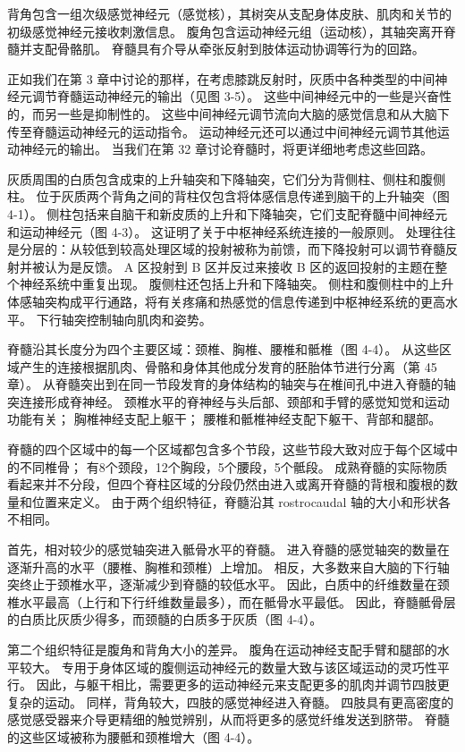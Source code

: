 背角包含一组次级感觉神经元（感觉核），其树突从支配身体皮肤、肌肉和关节的初级感觉神经元接收刺激信息。 腹角包含运动神经元组（运动核），其轴突离开脊髓并支配骨骼肌。 脊髓具有介导从牵张反射到肢体运动协调等行为的回路。

正如我们在第 3 章中讨论的那样，在考虑膝跳反射时，灰质中各种类型的中间神经元调节脊髓运动神经元的输出（见图 3-5）。 这些中间神经元中的一些是兴奋性的，而另一些是抑制性的。 这些中间神经元调节流向大脑的感觉信息和从大脑下传至脊髓运动神经元的运动指令。 运动神经元还可以通过中间神经元调节其他运动神经元的输出。 当我们在第 32 章讨论脊髓时，将更详细地考虑这些回路。

灰质周围的白质包含成束的上升轴突和下降轴突，它们分为背侧柱、侧柱和腹侧柱。 位于灰质两个背角之间的背柱仅包含将体感信息传递到脑干的上升轴突（图 4-1）。 侧柱包括来自脑干和新皮质的上升和下降轴突，它们支配脊髓中间神经元和运动神经元（图 4-3）。 这证明了关于中枢神经系统连接的一般原则。 处理往往是分层的：从较低到较高处理区域的投射被称为前馈，而下降投射可以调节脊髓反射并被认为是反馈。 A 区投射到 B 区并反过来接收 B 区的返回投射的主题在整个神经系统中重复出现。 腹侧柱还包括上升和下降轴突。 侧柱和腹侧柱中的上升体感轴突构成平行通路，将有关疼痛和热感觉的信息传递到中枢神经系统的更高水平。 下行轴突控制轴向肌肉和姿势。

脊髓沿其长度分为四个主要区域：颈椎、胸椎、腰椎和骶椎（图 4-4）。 从这些区域产生的连接根据肌肉、骨骼和身体其他成分发育的胚胎体节进行分离（第 45 章）。 从脊髓突出到在同一节段发育的身体结构的轴突与在椎间孔中进入脊髓的轴突连接形成脊神经。 颈椎水平的脊神经与头后部、颈部和手臂的感觉知觉和运动功能有关； 胸椎神经支配上躯干； 腰椎和骶椎神经支配下躯干、背部和腿部。

脊髓的四个区域中的每一个区域都包含多个节段，这些节段大致对应于每个区域中的不同椎骨； 有8个颈段，12个胸段，5个腰段，5个骶段。 成熟脊髓的实际物质看起来并不分段，但四个脊柱区域的分段仍然由进入或离开脊髓的背根和腹根的数量和位置来定义。 由于两个组织特征，脊髓沿其 rostrocaudal 轴的大小和形状各不相同。

首先，相对较少的感觉轴突进入骶骨水平的脊髓。 进入脊髓的感觉轴突的数量在逐渐升高的水平（腰椎、胸椎和颈椎）上增加。 相反，大多数来自大脑的下行轴突终止于颈椎水平，逐渐减少到脊髓的较低水平。 因此，白质中的纤维数量在颈椎水平最高（上行和下行纤维数量最多），而在骶骨水平最低。 因此，脊髓骶骨层的白质比灰质少得多，而颈髓的白质多于灰质（图 4-4）。

第二个组织特征是腹角和背角大小的差异。 腹角在运动神经支配手臂和腿部的水平较大。 专用于身体区域的腹侧运动神经元的数量大致与该区域运动的灵巧性平行。 因此，与躯干相比，需要更多的运动神经元来支配更多的肌肉并调节四肢更复杂的运动。 同样，背角较大，四肢的感觉神经进入脊髓。 四肢具有更高密度的感觉感受器来介导更精细的触觉辨别，从而将更多的感觉纤维发送到脐带。 脊髓的这些区域被称为腰骶和颈椎增大（图 4-4）。

